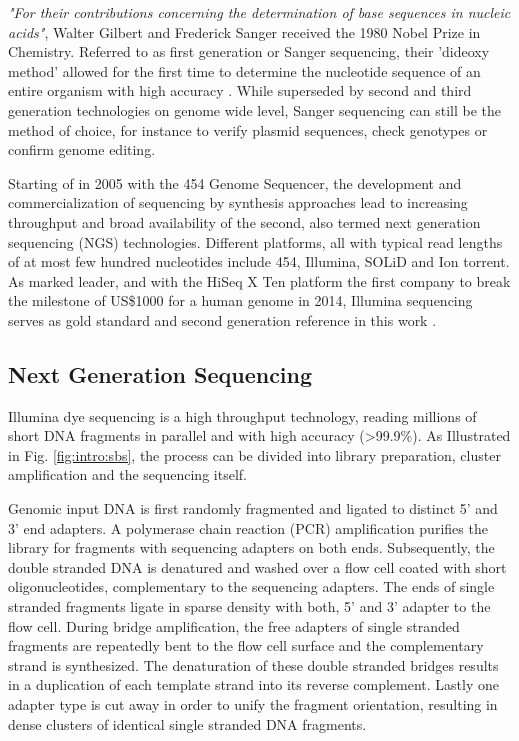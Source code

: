 \textit{"For their contributions concerning the determination of base sequences in nucleic acids"}, Walter Gilbert and Frederick Sanger received the 1980 Nobel Prize in Chemistry.
Referred to as first generation or Sanger sequencing, their 'dideoxy method' allowed for the first time to determine the nucleotide sequence of an entire organism with high accuracy \cite{Sanger1977}.
While superseded by second and third generation technologies on genome wide level, Sanger sequencing can still be the method of choice, for instance to verify plasmid sequences, check genotypes or confirm genome editing.

Starting of in 2005 with the 454 Genome Sequencer, the development and commercialization of sequencing by synthesis approaches lead to increasing throughput and broad availability of the second, also termed next generation sequencing (NGS) technologies.
Different platforms, all with typical read lengths of at most few hundred nucleotides include 454, Illumina, SOLiD and Ion torrent.
As marked leader, and with the HiSeq X Ten platform the first company to break the milestone of US\$1000 for a human genome in 2014, Illumina sequencing serves as gold standard and second generation reference in this work \cite{Dijk2014}.

\subsection{Next Generation Sequencing}
\label{subsec:intro:ngs}

Illumina dye sequencing is a high throughput technology, reading millions of short DNA fragments in parallel and with high accuracy (>99.9\%).
As Illustrated in Fig. \ref{fig:intro:sbs}, the process can be divided into library preparation, cluster amplification and the sequencing itself.

Genomic input DNA is first randomly fragmented and ligated to distinct 5' and 3' end adapters.
A polymerase chain reaction (PCR) amplification purifies the library for fragments with sequencing adapters on both ends.
Subsequently, the double stranded DNA is denatured and washed over a flow cell coated with short oligonucleotides, complementary to the sequencing adapters.
The ends of single stranded fragments ligate in sparse density with both, 5' and 3' adapter to the flow cell.
During bridge amplification, the free adapters of single stranded fragments are repeatedly bent to the flow cell surface and the complementary strand is synthesized. 
The denaturation of these double stranded bridges results in a duplication of each template strand into its reverse complement.
Lastly one adapter type is cut away in order to unify the fragment orientation, resulting in dense clusters of identical single stranded DNA fragments.

